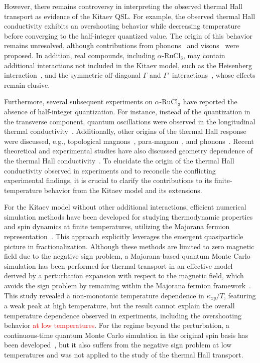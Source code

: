 \documentclass[twocolumn,superscriptaddress,showpacs, longbibliography, aps, prx]{revtex4-2}
\newcommand{\red}[1]{\textcolor{red}{#1}}
\begin{document}
However, there remains controversy in interpreting the observed thermal Hall transport as evidence of the Kitaev QSL. 
For example, the observed thermal Hall conductivity exhibits an overshooting behavior while decreasing temperature before converging to the half-integer quantized value. 
The origin of this behavior remains unresolved, although contributions from phonons~\cite{Ye2018Quantization,Vinkler2018} and visons~\cite{Joy2022} were proposed. 
In addition, real compounds, including $\alpha$-$\mathrm{RuCl_3}$, may contain additional interactions not included in the Kitaev model, such as the Heisenberg interaction~\cite{Chaloupka_PRL2010,Chaloupka_PRL2013}, and the symmetric off-diagonal $\Gamma$ and $\Gamma'$ interactions~\cite{Rau2014,Rau2014pre,Winter2016}, whose effects remain elusive. 

Furthermore, several subsequent experiments on $\alpha$-$\mathrm{RuCl_3}$ have reported the absence of half-integer quantization. 
For instance, instead of the quantization in the transverse component, quantum oscillations were observed in the longitudinal thermal conductivity~\cite{Czajka_NPhy2021}. 
Additionally, other origins of the thermal Hall response were discussed, e.g., topological magnons~\cite{Czajka_NMat2023,ChernZK2021,ZhangCK2021, McClartyDGRPMP2018,Joshi2018}, para-magnon~\cite{Hentrich_PRB2019}, and phonons~\cite{Lefra_PRX2022, OhN2025}. 
Recent theoretical and experimental studies have also discussed geometry dependence of the thermal Hall conductivity~\cite{Halasz2025,ZhangHGJWTMY2025}.
To elucidate the origin of the thermal Hall conductivity observed in experiments and to reconcile the conflicting experimental findings, it is crucial to clarify the contributions to its finite-temperature behavior from the Kitaev model and its extensions.

For the Kitaev model without other additional interactions, efficient numerical simulation methods have been developed for studying thermodynamic properties and spin dynamics at finite temperatures, utilizing the Majorana fermion representation~\cite{NasuUM2014,NasuUM2015,YoshitakeNM2016,YoshitakeNKM2017,YoshitakeNM2017}. 
This approach explicitly leverages the emergent quasiparticle picture in fractionalization. 
Although these methods are limited to zero magnetic field due to the negative sign problem, a Majorana-based quantum Monte Carlo simulation has been performed for thermal transport in an effective model derived by a perturbation expansion with respect to the magnetic field, which avoids the sign problem by remaining within the Majorana fermion framework~\cite{NasuYM2017}. 
This study revealed a non-monotonic temperature dependence in $\kappa_{xy}/T$, featuring a weak peak at high temperature, but the result cannot explain the overall temperature dependence observed in experiments, including the overshooting behavior \red{at low temperatures}. 
For the regime beyond the perturbation, a continuous-time quantum Monte Carlo simulation in the original spin basis has been developed~\cite{YoshitakeNKM2020}, but it also suffers from the negative sign problem at low temperatures and was not applied to the study of the thermal Hall transport. 
\end{document}
